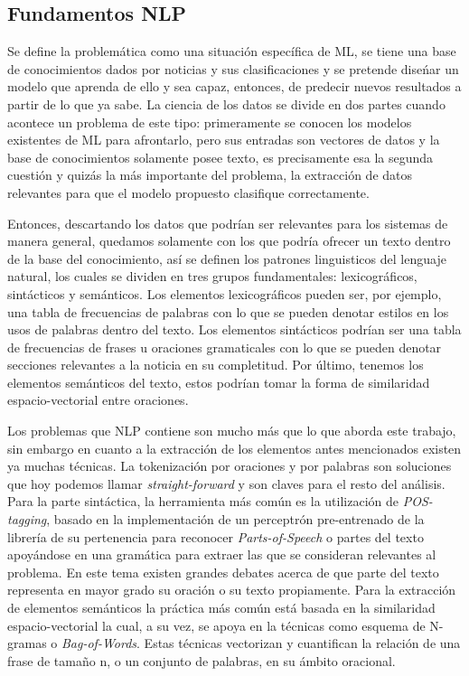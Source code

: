 \documentclass{llncs}
\begin{document}
\begin{multicols}{2}[]
\subsection{Fundamentos NLP}

Se define la problem\'atica como una situaci\'on espec\'ifica de ML, se tiene una base de conocimientos dados por noticias y sus clasificaciones y se pretende dise\'nar un modelo
que aprenda de ello y sea capaz, entonces, de predecir nuevos resultados a partir de lo que ya sabe. La ciencia de los datos se divide en dos partes cuando acontece un problema
de este tipo: primeramente se conocen los modelos existentes de ML para afrontarlo, pero sus entradas son vectores de datos y la base de conocimientos solamente posee texto, 
es precisamente esa la segunda cuesti\'on y quiz\'as la m\'as importante del problema, la extracci\'on de datos relevantes para que el modelo propuesto clasifique correctamente.

Entonces, descartando los datos que podr\'ian ser relevantes para los sistemas de manera general, quedamos solamente con los que podr\'ia ofrecer un texto dentro de la base del
conocimiento, as\'i se definen los patrones linguisticos del lenguaje natural, los cuales se dividen en tres grupos fundamentales: lexicogr\'aficos, sint\'acticos y sem\'anticos. Los 
elementos lexicogr\'aficos pueden ser, por ejemplo, una tabla de frecuencias de palabras con lo que se pueden denotar estilos en los usos de palabras dentro del texto. Los elementos
sint\'acticos podr\'ian ser una tabla de frecuencias de frases u oraciones gramaticales con lo que se pueden denotar secciones relevantes a la noticia en su completitud. Por \'ultimo,
tenemos los elementos sem\'anticos del texto, estos podr\'ian tomar la forma de similaridad espacio-vectorial entre oraciones.

Los problemas que NLP contiene son mucho m\'as que lo que aborda este trabajo, sin embargo en cuanto a la extracci\'on de los elementos antes mencionados existen ya muchas
t\'ecnicas.
La tokenizaci\'on por oraciones y por palabras son soluciones que hoy podemos llamar \textit{straight-forward} y son claves para el resto del an\'alisis. Para la parte sint\'actica, la
herramienta m\'as com\'un es la utilizaci\'on de \textit{POS-tagging}, basado en la implementaci\'on de un perceptr\'on pre-entrenado de la librer\'ia de su pertenencia para reconocer
\textit{Parts-of-Speech} o partes del texto apoy\'andose en una gram\'atica para extraer las que se consideran relevantes al problema. En este tema existen grandes debates acerca
de que parte del texto representa en mayor grado su oraci\'on o su texto propiamente. Para la extracci\'on de elementos sem\'anticos la pr\'actica m\'as com\'un est\'a basada en la 
similaridad espacio-vectorial la cual, a su vez, se apoya en la t\'ecnicas como esquema de N-gramas o \textit{Bag-of-Words}. Estas t\'ecnicas vectorizan y cuantifican la relaci\'on de una 
frase de tama\~no n, o un conjunto de palabras, en su \'ambito oracional.


\end{multicols}
\end{document}
